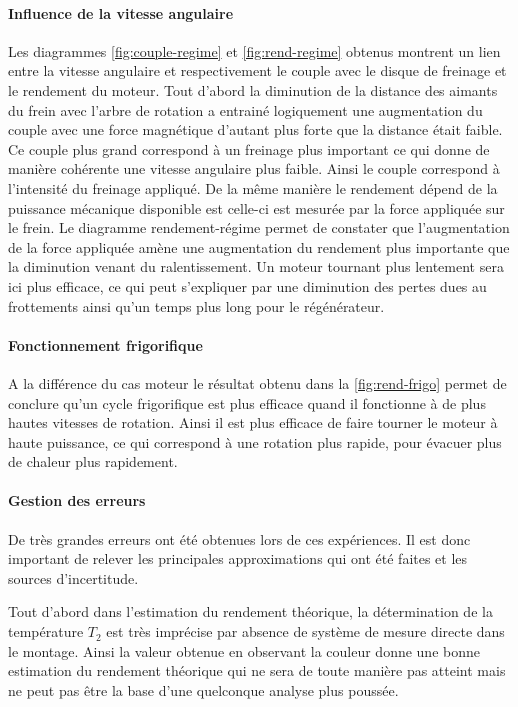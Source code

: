 \paragraph*{Influence de la vitesse angulaire}
Les diagrammes \autoref{fig:couple-regime} et \autoref{fig:rend-regime} obtenus montrent un lien entre la vitesse angulaire et respectivement le couple avec le disque de freinage et le rendement du moteur. Tout d'abord la diminution de la distance des aimants du frein avec l'arbre de rotation a entrainé logiquement une augmentation du couple avec une force magnétique d'autant plus forte que la distance était faible. Ce couple plus grand correspond à un freinage plus important ce qui donne de manière cohérente une vitesse angulaire plus faible. Ainsi le couple correspond à l'intensité du freinage appliqué. De la même manière le rendement dépend de la puissance mécanique disponible est celle-ci est mesurée par la force appliquée sur le frein. Le diagramme rendement-régime permet de constater que l'augmentation de la force appliquée amène une augmentation du rendement plus importante que la diminution venant du ralentissement. Un moteur tournant plus lentement sera ici plus efficace, ce qui peut s'expliquer par une diminution des pertes dues au frottements ainsi qu'un temps plus long pour le régénérateur.

\paragraph*{Fonctionnement frigorifique}
A la différence du cas moteur le résultat obtenu dans la \autoref{fig:rend-frigo} permet de conclure qu'un cycle frigorifique est plus efficace quand il fonctionne à de plus hautes vitesses de rotation. Ainsi il est plus efficace de faire tourner le moteur à haute puissance, ce qui correspond à une rotation plus rapide, pour évacuer plus de chaleur plus rapidement.


\paragraph*{Gestion des erreurs}
De très grandes erreurs ont été obtenues lors de ces expériences. Il est donc important de relever les principales approximations qui ont été faites et les sources d'incertitude.

Tout d'abord dans l'estimation du rendement théorique, la détermination de la température \(T_2\) est très imprécise par absence de système de mesure directe dans le montage. Ainsi la valeur obtenue en observant la couleur donne une bonne estimation du rendement théorique qui ne sera de toute manière pas atteint mais ne peut pas être la base d'une quelconque analyse plus poussée.

